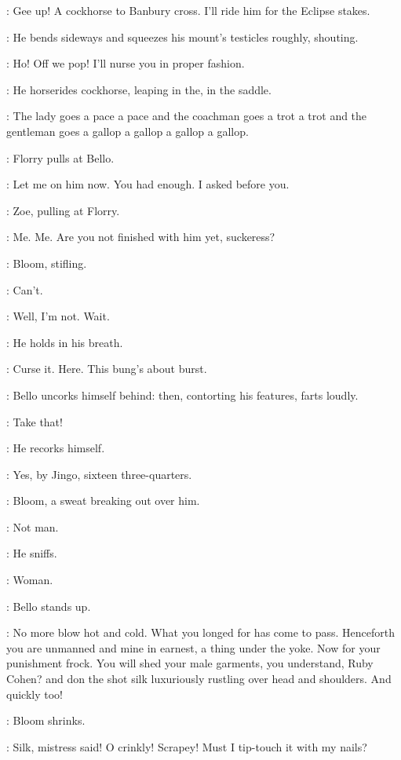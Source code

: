 \Bello:
Gee up!
A cockhorse to Banbury cross.
I'll ride him for the Eclipse stakes.

:
He bends sideways and squeezes his mount's testicles roughly, shouting.

\Bello:
Ho! Off we pop!
I'll nurse you in proper fashion.

:
He horserides cockhorse, leaping in the, in the saddle.

\Bello:
The lady goes a pace a pace and the coachman goes a trot a trot
and the gentleman goes a gallop a gallop a gallop a gallop.

:
Florry pulls at Bello.

\Florry:
Let me on him now.
You had enough.
I asked before you.

:
Zoe, pulling at Florry.

\Zoe:
Me. Me.
Are you not finished with him yet, suckeress?

:
Bloom, stifling.

\Bloom:
Can't.

\Bello:
Well, I'm not.
Wait.

:
He holds in his breath.

\Bello:
Curse it.
Here.
This bung's about burst.

:
Bello uncorks himself behind:
then, contorting his features, farts loudly.


\Bello:
Take that!

:
He recorks himself.

\Bello:
Yes, by Jingo, sixteen three-quarters.%

:
Bloom, a sweat breaking out over him.

\Bloom:
Not man.

:
He sniffs.

\Bloom:
Woman.

:
Bello stands up.

\Bello:
No more blow hot and cold.
What you longed for has come to pass.
Henceforth you are unmanned and mine in earnest, a thing under the yoke.
Now for your punishment frock.
You will shed your male garments, you understand, Ruby Cohen?
and don the shot silk luxuriously rustling over head and shoulders.
And quickly too!

:
Bloom shrinks.

\Bloom:
Silk, mistress said!
O crinkly!
Scrapey!
Must I tip-touch it with my nails?

